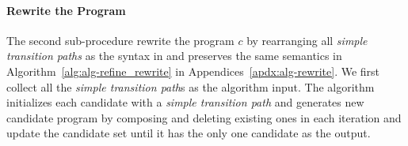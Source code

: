 
\paragraph{Rewrite the Program}
The second sub-procedure rewrite the program $c$ by rearranging all \emph{simple transition paths} as the syntax in \cite{GulwaniJK09} and preserves the same semantics in Algorithm~\ref{alg:alg-refine_rewrite} in Appendices~\ref{apdx:alg-rewrite}.
We first collect all the \emph{simple transition path}s as the algorithm input. 
The algorithm initializes each candidate with a \emph{simple transition path} and generates new candidate program by composing and deleting existing ones in each iteration and update the candidate set until it has the only one candidate as the output.
